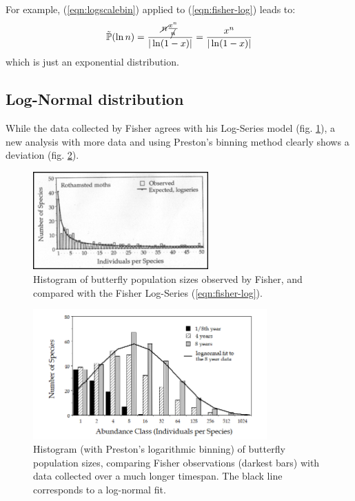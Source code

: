 \documentclass[../../main.tex]{subfiles}
\begin{document}
\medskip

For example, (\ref{eqn:logscalebin}) applied to (\ref{eqn:fisher-log}) leads to:
\begin{align*}
    \tilde{\mathbb{P}}(\ln n) = \frac{\cancel{n} \frac{x^n}{\cancel{n}}}{|\ln(1-x)|} = \frac{x^n}{|\ln(1-x)|} 
\end{align*}
which is just an exponential distribution.

\subsection{Log-Normal distribution}
While the data collected by Fisher agrees with his Log-Series model (fig. \ref{fig:fisher-log}), a new analysis with more data and using Preston's binning method clearly shows a deviation (fig. \ref{fig:preston-plot}).

\begin{figure}[H]
    \centering
    \includegraphics[width=0.6\textwidth]{fisher-log.png}
    \caption{Histogram of butterfly population sizes observed by Fisher, and compared with the Fisher Log-Series (\ref{eqn:fisher-log}).}
    \label{fig:fisher-log}
\end{figure}

\begin{figure}[H]
    \centering
    \includegraphics[width=0.8\textwidth]{preston-plot.png}
    \caption{Histogram (with Preston's logarithmic binning) of butterfly population sizes, comparing Fisher observations (darkest bars) with data collected over a much longer timespan. The black line corresponds to a log-normal fit.}
    \label{fig:preston-plot}
\end{figure}
\end{document}
